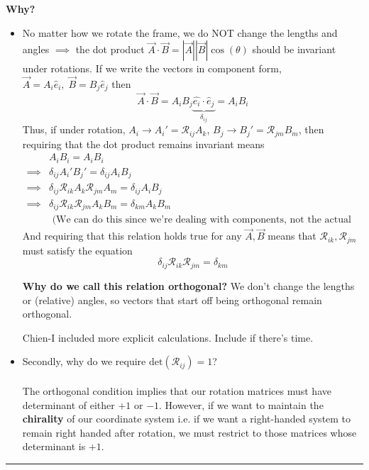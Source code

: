 \documentclass[11pt]{article}
\begin{document}
\vskip 0.5cm
\textbf{Why?} 
\begin{itemize}
  \item No matter how we rotate the frame, we do NOT change the lengths and angles $\implies$ the dot product $\vec{A} \cdot \vec{B} = |\vec{A}||\vec{B}|\cos(\theta)$ should be invariant under rotations. If we write the vectors in component form, $\vec{A} = A_i \hat{e}_i, \; \vec{B} = B_j \hat{e}_j$ then
  \[ \vec{A} \cdot \vec{B} = A_i B_j \underbrace{\hat{e_i} \cdot \hat{e}_j}_{\delta_{ij}} = A_i B_i \]
  Thus, if under rotation, $A_i \rightarrow A_i' = \mathcal{R}_{ij} A_k$, $B_j \rightarrow B_j' = \mathcal{R}_{jm} B_m$, then requiring that the dot product remains invariant means 
  \begin{align*}
    &A_i B_i = A_i B_i\\
    \implies& \delta_{ij} A_i' B_j' = \delta_{ij} A_i B_j \\
    \implies& \delta_{ij} \mathcal{R}_{ik} A_{k} \mathcal{R}_{jm} A_{m} = \delta_{ij} A_{i} B_{j} \\
    \implies& \delta_{ij} \mathcal{R}_{ik} \mathcal{R}_{jm} A_{k} B_{m} = \delta_{km} A_{k} B_{m} \\
    &\text{ (We can do this since we're dealing with components, not the actual matrices.)} 
  \end{align*} 
  And requiring that this relation holds true for any $\vec{A}, \vec{B}$ means that $\mathcal{R}_{ik}, \mathcal{R}_{jm}$ must satisfy the equation
  \[ \boxed{\delta_{ij} \mathcal{R}_{ik}  \mathcal{R}_{jm} = \delta_{km}} \]

  \textbf{Why do we call this relation orthogonal?} We don't change the lengths or (relative) angles, so vectors that start off being orthogonal remain orthogonal. \begin{note}
    {Chien-I included more explicit calculations. Include if there's time.}
  \end{note}

  \item Secondly, why do we require $\mathrm{det}(\mathcal{R}_{ij}) = 1$? 
  \\
  \\
  The orthogonal condition implies that our rotation matrices must have determinant of either $+1$ or $-1$. However, if we want to maintain the \textbf{chirality} of our coordinate system i.e. if we want a right-handed system to remain right handed after rotation, we must restrict to those matrices whose determinant is $+1$.
\end{itemize}
\hrule
\end{document}
